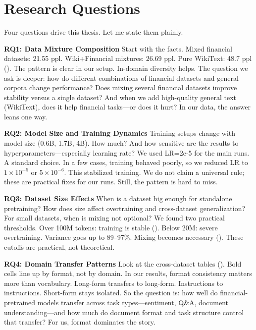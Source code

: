 \section{Research Questions}

Four questions drive this thesis. Let me state them plainly.

\textbf{RQ1: Data Mixture Composition}
Start with the facts. Mixed financial datasets: 21.55 ppl. Wiki+Financial mixtures: 26.69 ppl. Pure WikiText: 48.7 ppl (). The pattern is clear in our setup. In-domain diversity helps. The question we ask is deeper: how do different combinations of financial datasets and general corpora change performance? Does mixing several financial datasets improve stability versus a single dataset? And when we add high-quality general text (WikiText), does it help financial tasks—or does it hurt? In our data, the answer leans one way.

\textbf{RQ2: Model Size and Training Dynamics}
Training setups change with model size (0.6B, 1.7B, 4B). How much? And how sensitive are the results to hyperparameters—especially learning rate? We used LR=2e-5 for the main runs. A standard choice. In a few cases, training behaved poorly, so we reduced LR to $1\times10^{-5}$ or $5\times10^{-6}$. This stabilized training. We do not claim a universal rule; these are practical fixes for our runs. Still, the pattern is hard to miss.

\textbf{RQ3: Dataset Size Effects}
When is a dataset big enough for standalone pretraining? How does size affect overtraining and cross-dataset generalization? For small datasets, when is mixing not optional? We found two practical thresholds. Over 100M tokens: training is stable (). Below 20M: severe overtraining. Variance goes up to 89--97\%. Mixing becomes necessary (). These cutoffs are practical, not theoretical.

\textbf{RQ4: Domain Transfer Patterns}
Look at the cross-dataset tables (). Bold cells line up by format, not by domain. In our results, format consistency matters more than vocabulary. Long-form transfers to long-form. Instructions to instructions. Short-form stays isolated. So the question is: how well do financial-pretrained models transfer across task types—sentiment, Q\&A, document understanding—and how much do document format and task structure control that transfer? For us, format dominates the story.

